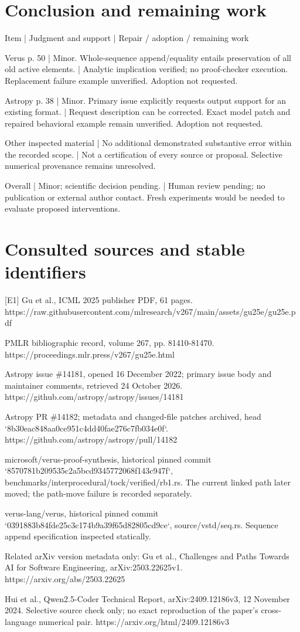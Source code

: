 \documentclass[10pt]{article}
\begin{document}
\section*{Conclusion and remaining work}
Item | Judgment and support | Repair / adoption / remaining work\par
Verus p. 50 | Minor. Whole-sequence append/equality entails preservation of all old active elements. | Analytic implication verified; no proof-checker execution. Replacement failure example unverified. Adoption not requested.\par
Astropy p. 38 | Minor. Primary issue explicitly requests output support for an existing format. | Request description can be corrected. Exact model patch and repaired behavioral example remain unverified. Adoption not requested.\par
Other inspected material | No additional demonstrated substantive error within the recorded scope. | Not a certification of every source or proposal. Selective numerical provenance remains unresolved.\par
Overall | Minor; scientific decision pending. | Human review pending; no publication or external author contact. Fresh experiments would be needed to evaluate proposed interventions.\par
\section*{Consulted sources and stable identifiers}
[E1] Gu et al., ICML 2025 publisher PDF, 61 pages. https://raw.githubusercontent.com/mlresearch/v267/main/assets/gu25e/gu25e.pdf\par
[E2] PMLR bibliographic record, volume 267, pp. 81410-81470. https://proceedings.mlr.press/v267/gu25e.html\par
[E3] Astropy issue \#14181, opened 16 December 2022; primary issue body and maintainer comments, retrieved 24 October 2026. https://github.com/astropy/astropy/issues/14181\par
[E4] Astropy PR \#14182; metadata and changed-file patches archived, head `8b30eac848aa0ce951c4dd40fae276c7fb034e0f`. https://github.com/astropy/astropy/pull/14182\par
[E5] microsoft/verus-proof-synthesis, historical pinned commit `8570781b209535c2a5bcd9345772068f143c947f`, benchmarks/interprocedural/tock/verified/rb1.rs. The current linked path later moved; the path-move failure is recorded separately.\par
[E6] verus-lang/verus, historical pinned commit `0391883b84fde25c3c174b9a39f65d82805cd9ce`, source/vstd/seq.rs. Sequence append specification inspected statically.\par
[E7] Related arXiv version metadata only: Gu et al., Challenges and Paths Towards AI for Software Engineering, arXiv:2503.22625v1. https://arxiv.org/abs/2503.22625\par
[E8] Hui et al., Qwen2.5-Coder Technical Report, arXiv:2409.12186v3, 12 November 2024. Selective source check only; no exact reproduction of the paper’s cross-language numerical pair. https://arxiv.org/html/2409.12186v3\par
\end{document}
